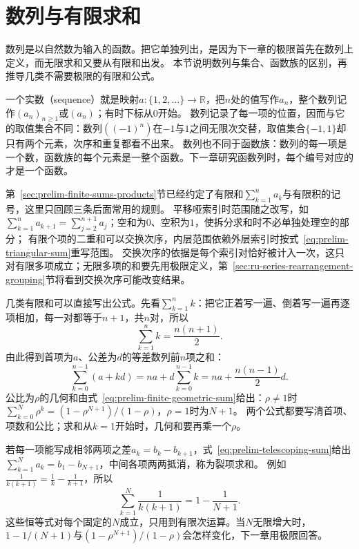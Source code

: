 \section{数列与有限求和}
\label{sec:ru-sequences-finite-sums}

数列是以自然数为输入的函数。把它单独列出，是因为下一章的极限首先在数列上定义，而无限求和又要从有限和出发。
本节说明数列与集合、函数族的区别，再推导几类不需要极限的有限和公式。

一个实数（sequence）就是映射$a:\{1,2,\ldots\}\to\mathbb R$，把$n$处的值写作$a_n$，整个数列记作$(a_n)_{n\geq1}$或$(a_n)$；有时下标从$0$开始。
数列记录了每一项的位置，因而与它的取值集合不同：数列$((-1)^n)$在$-1$与$1$之间无限次交替，取值集合$\{-1,1\}$却只有两个元素，次序和重复都看不出来。
数列也不同于函数族：数列的每一项是一个数，函数族的每个元素是一整个函数。下一章研究函数列时，每个编号对应的才是一个函数。

第~\ref{sec:prelim-finite-sums-products}节已经约定了有限和$\sum_{k=1}^na_k$与有限积的记号，这里只回顾三条后面常用的规则。
平移哑索引时范围随之改写，如$\sum_{k=1}^{n}a_{k+1}=\sum_{j=2}^{n+1}a_j$；空和为$0$、空积为$1$，使拆分求和时不必单独处理空的部分；
有限个项的二重和可以交换次序，内层范围依赖外层索引时按式~\eqref{eq:prelim-triangular-sum}重写范围。
交换次序的依据是每个索引对恰好被计入一次，这只对有限多项成立；无限多项的和要先用极限定义，第~\ref{sec:ru-series-rearrangement-grouping}节将看到交换次序可能改变结果。

几类有限和可以直接写出公式。先看$\sum_{k=1}^nk$：把它正着写一遍、倒着写一遍再逐项相加，每一对都等于$n+1$，共$n$对，所以
\[
 \sum_{k=1}^nk=\frac{n(n+1)}2.
\]
由此得到首项为$a$、公差为$d$的等差数列前$n$项之和：
\[
 \sum_{k=0}^{n-1}(a+kd)=na+d\sum_{k=0}^{n-1}k=na+\frac{n(n-1)}2d.
\]
公比为$\rho$的几何和由式~\eqref{eq:prelim-finite-geometric-sum}给出：$\rho\neq1$时$\sum_{k=0}^N\rho^k=(1-\rho^{N+1})/(1-\rho)$，$\rho=1$时为$N+1$。
两个公式都要写清首项、项数和公比；求和从$k=1$开始时，几何和要再乘一个$\rho$。

若每一项能写成相邻两项之差$a_k=b_k-b_{k+1}$，式~\eqref{eq:prelim-telescoping-sum}给出$\sum_{k=1}^Na_k=b_1-b_{N+1}$，中间各项两两抵消，称为裂项求和。
例如$\frac1{k(k+1)}=\frac1k-\frac1{k+1}$，所以
\[
 \sum_{k=1}^N\frac1{k(k+1)}=1-\frac1{N+1}.
\]
这些恒等式对每个固定的$N$成立，只用到有限次运算。当$N$无限增大时，$1-1/(N+1)$与$(1-\rho^{N+1})/(1-\rho)$会怎样变化，下一章用极限回答。
